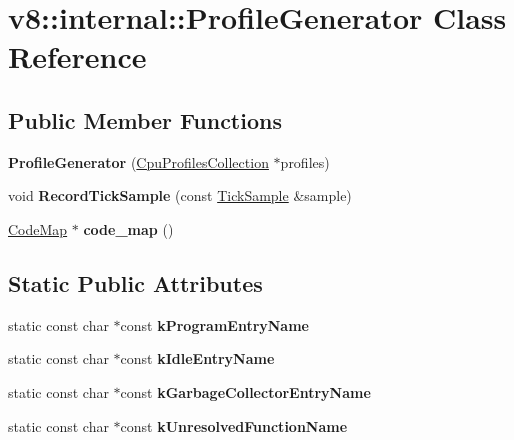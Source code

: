 \hypertarget{classv8_1_1internal_1_1_profile_generator}{}\section{v8\+:\+:internal\+:\+:Profile\+Generator Class Reference}
\label{classv8_1_1internal_1_1_profile_generator}
\subsection*{Public Member Functions}
\begin{DoxyCompactItemize}
\item 
{\bfseries Profile\+Generator} (\hyperlink{classv8_1_1internal_1_1_cpu_profiles_collection}{Cpu\+Profiles\+Collection} $\ast$profiles)\hypertarget{classv8_1_1internal_1_1_profile_generator_a538d180f766813125ded7ce7d5e69693}{}\label{classv8_1_1internal_1_1_profile_generator_a538d180f766813125ded7ce7d5e69693}

\item 
void {\bfseries Record\+Tick\+Sample} (const \hyperlink{structv8_1_1internal_1_1_tick_sample}{Tick\+Sample} \&sample)\hypertarget{classv8_1_1internal_1_1_profile_generator_a321d0ff6232f550c83d0ffc43da9f599}{}\label{classv8_1_1internal_1_1_profile_generator_a321d0ff6232f550c83d0ffc43da9f599}

\item 
\hyperlink{classv8_1_1internal_1_1_code_map}{Code\+Map} $\ast$ {\bfseries code\+\_\+map} ()\hypertarget{classv8_1_1internal_1_1_profile_generator_a8e7b039f4a0e933edd362264a5c0dd6a}{}\label{classv8_1_1internal_1_1_profile_generator_a8e7b039f4a0e933edd362264a5c0dd6a}

\end{DoxyCompactItemize}
\subsection*{Static Public Attributes}
\begin{DoxyCompactItemize}
\item 
static const char $\ast$const {\bfseries k\+Program\+Entry\+Name}
\item 
static const char $\ast$const {\bfseries k\+Idle\+Entry\+Name}
\item 
static const char $\ast$const {\bfseries k\+Garbage\+Collector\+Entry\+Name}
\item 
static const char $\ast$const {\bfseries k\+Unresolved\+Function\+Name}
\end{DoxyCompactItemize}
